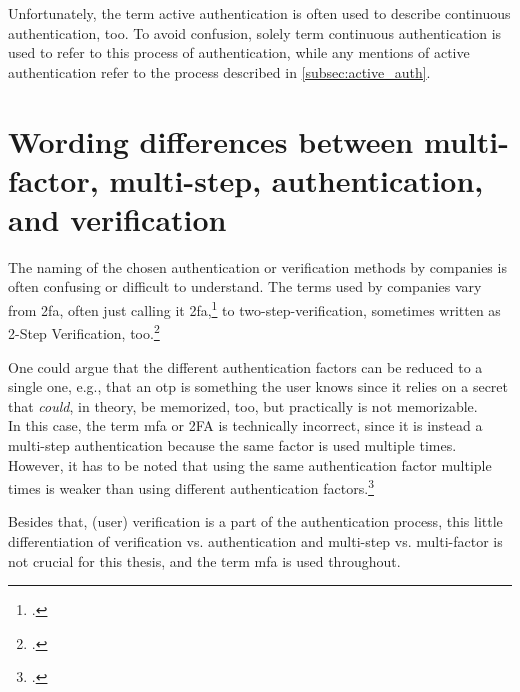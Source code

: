 Unfortunately, the term active authentication is often used to describe continuous authentication, too. To avoid confusion, solely term continuous authentication is used to refer to this process of authentication, while any mentions of active authentication refer to the process described in \autoref{subsec:active_auth}.

\section{Wording differences between multi-factor, multi-step, authentication, and verification}

The naming of the chosen authentication or verification methods by companies is often confusing or difficult to understand. The terms used by companies vary from \gls{2fa}, often just calling it \gls{2fa},\footcite{apple_2fa} to two-step-verification, sometimes written as 2-Step Verification, too.\footcites[][]{apple_s2v}[][]{playstation}[][]{google_2-step_verification}[][]{microsoft_2sv}

One could argue that the different authentication factors can be reduced to a single one, e.g., that an \gls{otp} is \frqq something the user knows\flqq{} since it relies on a secret that \textit{could}, in theory, be memorized, too, but practically is not memorizable.\\
In this case, the term \gls{mfa} or 2FA is technically incorrect, since it is instead a multi-step authentication because the same factor is used multiple times. However, it has to be noted that using the same authentication factor multiple times is weaker than using different authentication factors.\footcite[See][117]{grimes2017hacking}

Besides that, (user) verification is a part of the authentication process, this little differentiation of verification vs. authentication and multi-step vs. multi-factor is not crucial for this thesis, and the term \gls{mfa} is used throughout.

%
%
%
